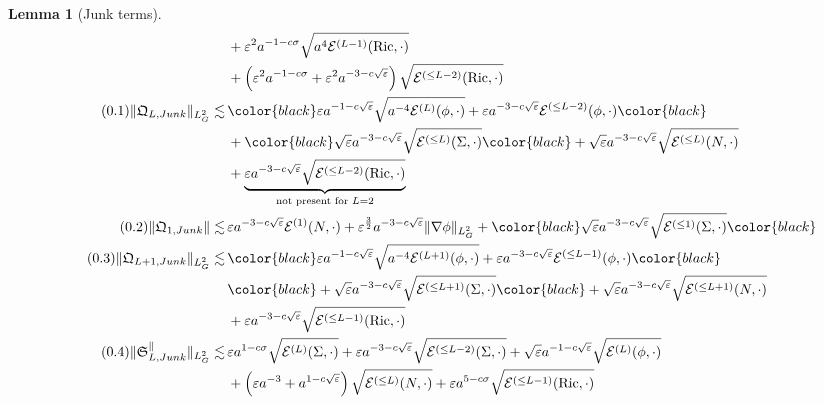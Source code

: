 \documentclass[11pt,leqno,textwidth=10cm]{amsart}
\numberwithin{equation}{section}
\theoremstyle{definition}
\theoremstyle{plain}
\newtheorem{lemma}[definition]{Lemma}
\newcommand{\1}{\mathbbm{1}}
\newcommand{\E}{\mathcal{E}}
\newcommand{\Ric}{\text{\normalfont{Ric}}}
\renewcommand{\epsilon}{\varepsilon}
\newcommand{\Lap}{\Delta}
\newcommand{\numberthis}{\addtocounter{equation}{1}\tag{\theequation}}
\renewcommand{\theequation}{\arabic{section}.\arabic{equation}}
\newcommand{\change}[1]{\color{black}#1\color{black}}
\begin{document}
\begin{lemma}[Junk terms]
\begin{subequations}
\begin{align*}
&\,+\epsilon^2a^{-1-c\sigma}\sqrt{a^4\E^{(L-1)}(\Ric,\cdot)}\\
&\,+\left(\epsilon^2a^{-1-c\sigma}+\epsilon^2 a^{-3-c\sqrt{\epsilon}}\right)\sqrt{\E^{(\leq L-2)}(\Ric,\cdot)}\\
\numberthis\label{eq:L2-junk-Q-even}\|\mathfrak{Q}_{L,Junk}\|_{L^2_G}\lesssim&\,%
\change{\epsilon a^{-1-c\sqrt{\epsilon}}\sqrt{a^{-4}\E^{(L)}(\phi,\cdot)}+\epsilon a^{-3-c\sqrt{\epsilon}}\E^{(\leq L-2)}(\phi,\cdot)}\\
&\,+\change{\sqrt{\epsilon}a^{-3-c\sqrt{\epsilon}}\sqrt{\E^{(\leq L)}(\Sigma,\cdot)}}+\sqrt{\epsilon}a^{-3-c\sqrt{\epsilon}}\sqrt{\E^{(\leq L)}(N,\cdot)}\\
&\,+\underbrace{\epsilon a^{-3-c\sqrt{\epsilon}}\sqrt{\E^{(\leq L-2)}(\Ric,\cdot)}}_{\text{not present for }L=2}\\
\numberthis\label{eq:L2-junk-Q-1}\|\mathfrak{Q}_{1,Junk}\|\lesssim&\,\epsilon a^{-3-c\sqrt{\epsilon}}\E^{(1)}(N,\cdot)+\epsilon^\frac32a^{-3-c\sqrt{\epsilon}}\|\nabla\phi\|_{L^2_G}+\change{\sqrt{\epsilon}a^{-3-c\sqrt{\epsilon}}\sqrt{\E^{(\leq 1)}(\Sigma,\cdot)}}\\
\numberthis\label{eq:L2-junk-Q-odd}\|\mathfrak{Q}_{L+1,Junk}\|_{L^2_G}\lesssim&\,%
\change{\epsilon a^{-1-c\sqrt{\epsilon}}\sqrt{a^{-4}\E^{(L+1)}(\phi,\cdot)}+\epsilon a^{-3-c\sqrt{\epsilon}}\E^{(\leq L-1)}(\phi,\cdot)}\\
&\,\change{+\sqrt{\epsilon}a^{-3-c\sqrt{\epsilon}}\sqrt{\E^{(\leq L+1)}(\Sigma,\cdot)}}+\sqrt{\epsilon} a^{-3-c\sqrt{\epsilon}}\sqrt{\E^{(\leq L+1)}(N,\cdot)}\\
&\,+\epsilon a^{-3-c\sqrt{\epsilon}}\sqrt{\E^{(\leq L-1)}(\Ric,\cdot)}\\
\numberthis\label{eq:L2-junk-S}\|\mathfrak{S}_{L,Junk}^\parallel\|_{L^2_G}\lesssim&\,\epsilon a^{1-c\sigma}\sqrt{\E^{(L)}(\Sigma,\cdot)}+\epsilon a^{-3-c\sqrt{\epsilon}}\sqrt{\E^{(\leq L-2)}(\Sigma,\cdot)}+\sqrt{\epsilon}a^{-1-c\sqrt{\epsilon}}\sqrt{\E^{(L)}(\phi,\cdot)}\\
&\,+\left(\epsilon a^{-3}+a^{1-c\sqrt{\epsilon}}\right)\sqrt{\E^{(\leq L)}(N,\cdot)}+\epsilon a^{5-c\sigma}\sqrt{\E^{(\leq L-1)}(\Ric,\cdot)}\\

\end{align*}
\end{subequations}
\end{lemma}
\end{document}
